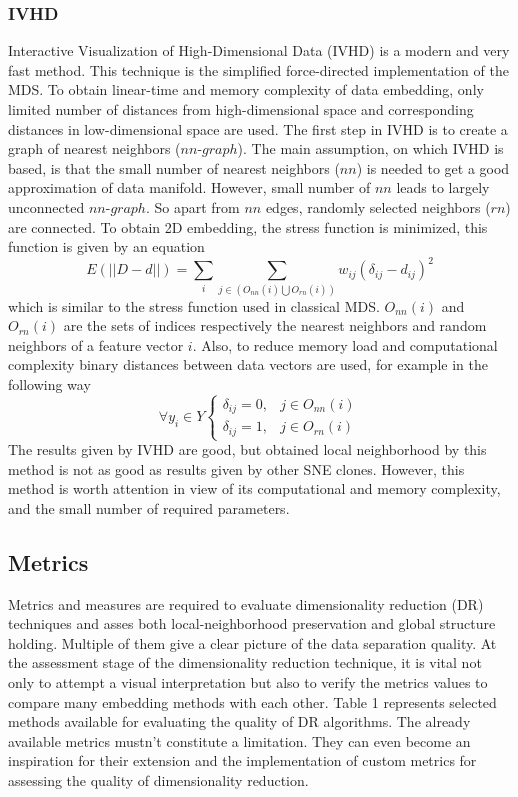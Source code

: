 \documentclass[12pt]{article}
\begin{document}
\subsubsection{IVHD}
Interactive Visualization of High-Dimensional Data (IVHD) is a modern and very fast method. This technique is the simplified force-directed implementation of the MDS. To obtain linear-time and memory complexity of data embedding, only limited number of distances from high-dimensional space and corresponding distances in low-dimensional space are used. The first step in IVHD is to create a graph of nearest neighbors ($nn\text{-}graph$). The main assumption, on which IVHD is based, is that the small number of nearest neighbors ($nn$) is needed to get a good approximation of data manifold. However, small number of $nn$ leads to largely unconnected $nn\text{-}graph$. So apart from $nn$ edges, randomly selected neighbors ($rn$) are connected. To obtain 2D embedding, the stress function is minimized, this function is given by an equation
\begin{equation}
\label{eq:ivhd_stress}
    E(||D-d||)=\sum_{i}\sum_{j\in{(O_{nn}(i)\bigcup O_{rn}(i))}}  w_{ij}(\delta_{ij}-d_{ij})^2
\end{equation}
which is similar to the stress function used in classical MDS. $O_{nn}(i)$ and $O_{rn}(i)$ are the sets of indices respectively the nearest neighbors and random neighbors of a feature vector $i$. Also, to reduce memory load and computational complexity binary distances between data vectors are used, for example in the following way
\begin{equation}
\label{eq:ivhd_bd}
\forall y_{i} \in Y \begin{cases} \delta_{ij}=0, & j\in{O_{nn}(i)} \\ \delta_{ij}=1, & j\in{O_{rn}(i)} \end{cases}
\end{equation}
The results given by IVHD are good, but obtained local neighborhood by this method is not as good as results given by other SNE clones. However, this method is worth attention in view of its computational and memory complexity, and the small number of required parameters\cite{Dzwinel20192DEO}.
\subsection{Metrics}
Metrics and measures are required to evaluate dimensionality reduction (DR) techniques and asses both local-neighborhood preservation and global structure holding. Multiple of them give a clear picture of the data separation quality. At the assessment stage of the dimensionality reduction technique, it is vital not only to attempt a visual interpretation but also to verify the metrics values to compare many embedding methods with each other. Table 1 represents selected methods available for evaluating the quality of DR algorithms. The already available metrics mustn't constitute a limitation. They can even become an inspiration for their extension and the implementation of custom metrics for assessing the quality of dimensionality reduction.
\end{document}
